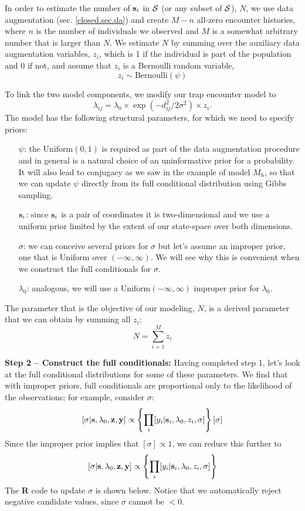 In order to estimate the number of ${\bf s}_i$ in ${\cal S}$ (or any
subset of ${\cal S}$), $N$, we use data augmentation (sec. \ref{closed.sec.da}) and create $M-n$ all-zero encounter histories, where $n$ is the number of individuals we observed and $M$ is a somewhat arbitrary number that is larger than $N$. We estimate $N$ by summing over the auxiliary data augmentation variables, $z_i$, which is 1 if the individual is part of the population and 0 if not, and assume that $z_i$ is a Bernoulli random variable,
\[
z_{i} \sim \mbox{Bernoulli}(\psi)
\]

To link the two model components, we modify our trap encounter model to
\[
\lambda_{ij} = \lambda_0 \times \exp(-d_{ij}^2/2\sigma^2) \times z_{i}.
\]
The model has the following structural parameters, for which we need to specify priors:
\begin{itemize}
\item[ $\psi$:] the $\mbox{Uniform}(0,1)$ is required as part of the data augmentation procedure and in general is a natural choice of an uninformative prior for a probability. It will also lead to conjugacy as we saw in the example of model $M_h$, so that we can update $\psi$ directly from its full conditional distribution using Gibbs sampling.
\item[ ${\bf s}_{i}$:] since ${\bf s}_{i}$ is a pair of coordinates it is two-dimensional and we use a uniform prior limited by the extent of our state-space over both dimensions.
\item[ $\sigma$:] we can conceive several priors for $\sigma$ but let's assume an improper prior, one that is Uniform over $(-\infty, \infty)$. We will see why this is convenient when we construct the full conditionals for $\sigma$.
\item[ $\lambda_{0}$:] analogous, we will use a $\mbox{Uniform}(-\infty, \infty)$ improper prior for $\lambda_{0}$.
\end{itemize}
The parameter that is the objective of our modeling, $N$, is a derived parameter that we can obtain by summing all $z_i$:
\[
N = \sum_{i=1}^{M} z_{i}
\]

{\bf Step 2 -- Construct the full conditionals:}
Having completed step 1, let's look at the full conditional distributions for some of these parameters.
We find that with improper priors, full conditionals are proportional only to the likelihood of the observations; for example, consider $\sigma$:
\[
[\sigma|{\bf s}, \lambda_{0}, {\bf z}, {\bf y}] \propto \left\{ \prod_{i} [y_{i}| {\bf
    s}_{i}, \lambda_{0}, z_{i}, \sigma] \right\}  [\sigma]
\]
Since the improper prior implies that $[\sigma] \propto 1$, we can reduce this further to
\[
[\sigma|{\bf s}, \lambda_{0}, {\bf z}, {\bf y}] \propto \left\{
  \prod_{i} [y_{i}| {\bf s}_{i}, \lambda_{0}, z_{i}, \sigma] \right\}
\]
The {\bf R} code to update $\sigma$ is shown below.
Notice that we automatically reject negative candidate values, since $\sigma$ cannot be $<0$.  

